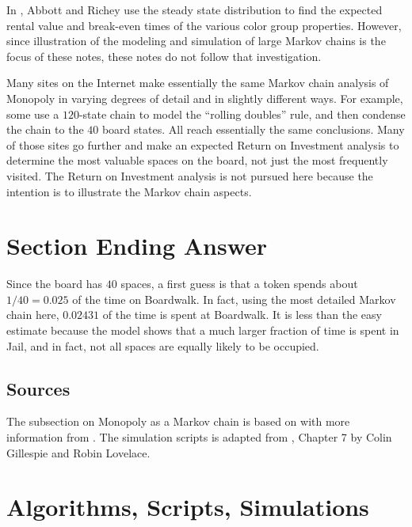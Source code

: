 \documentclass[12pt]{article}
\begin{document}
In
\cite{abbott97}, Abbott and Richey use the steady state distribution
to find the expected rental value and
break-even times of the various color group properties.  However, since
illustration of the modeling and simulation of large Markov chains is
the focus of these notes, these notes do not follow that investigation.

Many sites on the Internet make essentially the same Markov chain
analysis of Monopoly in varying degrees of detail and in slightly
different ways.  For example, some use a \( 120 \)-state chain to model
the ``rolling doubles'' rule, and then condense the chain to the \( 40 \)
board states. All reach essentially the same conclusions.  Many of those
sites go further and make an expected Return on Investment analysis to
determine the most valuable spaces on the board, not just the most
frequently visited.  The Return on Investment analysis is not pursued
here because the intention is to illustrate the Markov chain aspects.

\section*{Section Ending Answer}

Since the board has \( 40 \) spaces, a first guess is that a token
spends about \( 1/40 = 0.025 \) of the time on Boardwalk.  In fact,
using the most detailed Markov chain here, \( 0.02431 \) of the time is
spent at Boardwalk.  It is less than the easy estimate because the model
shows that a much larger fraction of time is spent in Jail, and in fact,
not all spaces are equally likely to be occupied.

\subsection*{Sources}

The subsection on Monopoly as a Markov chain is based on
\cite{abbott97} with more information from
\cite{ash72}.  The simulation scripts is adapted from
, Chapter 7
by Colin Gillespie and Robin Lovelace. 


\hr

\section*{Algorithms, Scripts, Simulations}
\end{document}
